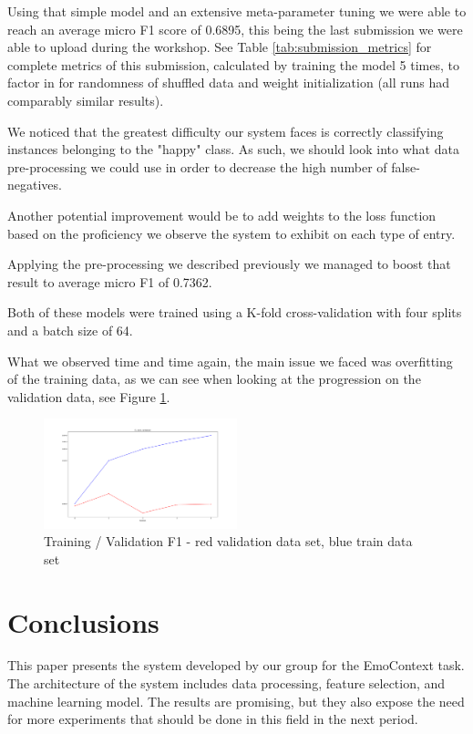 \documentclass[11pt,a4paper]{article}
\begin{document}
Using that simple model and an extensive meta-parameter tuning we were able to reach an average micro F1 score of 0.6895, this being the last submission we were able to upload during the workshop. See Table \ref{tab:submission_metrics} for complete metrics of this submission, calculated by training the model 5 times, to factor in for randomness of shuffled data and weight initialization (all runs had comparably similar results).

We noticed that the greatest difficulty our system faces is correctly classifying instances belonging to the "happy" class. As such, we should look into what data pre-processing we could use in order to decrease the high number of false-negatives.

Another potential improvement would be to add weights to the loss function based on the proficiency we observe the system to exhibit on each type of entry.

Applying the pre-processing we described previously we managed to boost that result to average micro F1 of 0.7362.

Both of these models were trained using a K-fold cross-validation with four splits and a batch size of 64.

What we observed time and time again, the main issue we faced was overfitting of the training data, as we can see when looking at the progression on the validation data, see Figure \ref{fig:train_validation_f1}.

\begin{figure}[!h]
    \centering
    \includegraphics[width=0.5\textwidth]{images/graph_f1_train_validation.png}
    \caption{Training / Validation F1 - red validation data set, blue train data set}
    \label{fig:train_validation_f1}
\end{figure}

\section{Conclusions}
This paper presents the system developed by our group for the EmoContext task. The architecture of the system includes data processing, feature selection, and machine learning model. The results are promising, but they also expose the need for more experiments that should be done in this field in the next period.
\end{document}
